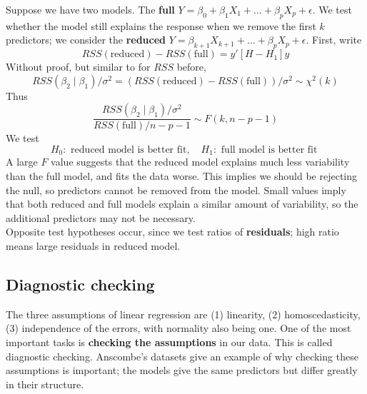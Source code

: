 \documentclass[12pt, a4paper]{article}
\theoremstyle{definition}
\newcommand{\eps}{\epsilon}
\newcommand{\df}{\dfrac}
\begin{document}
		Suppose we have two models. The {\bf full} $Y = \beta_0 + \beta_1 X_1 + \ldots + \beta_p X_p + \eps$. We test whether the model still explains the response when we remove the first $k$ predictors; we consider the {\bf reduced} $Y = \beta_{k+1} X_{k+1} + \ldots + \beta_p X_p + \eps$. First, write 
			$$RSS(\text{reduced}) - RSS(\text{full}) = y'[H - H_1]y$$ 
		Without proof, but similar to for $RSS$ before, 
		$$RSS(\beta_2 \mid \beta_1)/\sigma^2 = (RSS(\text{reduced}) - RSS(\text{full})) / \sigma^2 \sim \chi^2(k)$$
		Thus 
		$$\df{RSS(\beta_2 \mid \beta_1)/\sigma^2}{RSS(\text{full}) / n-p-1} \sim F(k, n-p-1)$$
		We test
		$$
			H_0 : \text{ reduced model is better fit}, \quad H_1: \text{ full model is better fit }
		$$
		A large $F$ value suggests that the reduced model explains much less variability than the full model, and fits the data worse. This implies we should be rejecting the null, so predictors cannot be removed from the model. Small values imply that both reduced and full models explain a similar amount of variability, so the additional predictors may not be necessary.\\
		
		Opposite test hypotheses occur, since we test ratios of {\bf residuals}; high ratio means large residuals in reduced model.
		
		\subsection{Diagnostic checking}
		
		The three assumptions of linear regression are (1) linearity, (2) homoscedasticity, (3) independence of the errors, with normality also being one. One of the most important tasks is {\bf checking the assumptions} in our data. This is called diagnostic checking. Anscombe's datasets give an example of why checking these assumptions is important; the models give the same predictors but differ greatly in their structure. \\
		
\end{document}
